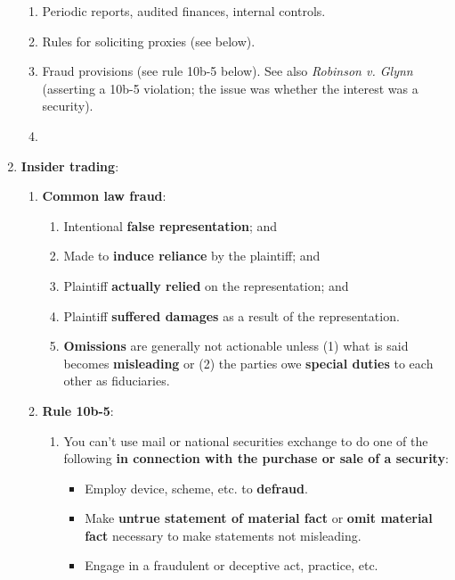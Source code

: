 \begin{enumerate}
\begin{enumerate}
        \item Periodic reports, audited finances, internal controls.
        \item Rules for soliciting proxies (see below).
        \item Fraud provisions (see rule 10b-5 below). See also \emph{Robinson 
        v. Glynn} (asserting a 10b-5 violation; the issue was whether 
        the interest was a security).
        \item 
    \end{enumerate}
    \item \textbf{Insider trading}:
    \begin{enumerate}
        \item \textbf{Common law fraud}:
        \begin{enumerate}
            \item Intentional \textbf{false representation}; and
            \item Made to \textbf{induce reliance} by the plaintiff; and
            \item Plaintiff \textbf{actually relied} on the representation; 
            and
            \item Plaintiff \textbf{suffered damages} as a result of the 
            representation.
            \item \textbf{Omissions} are generally not actionable unless (1) 
            what is said becomes \textbf{misleading} or (2) the parties owe 
            \textbf{special duties} to each other as fiduciaries.
        \end{enumerate}
        \item \textbf{Rule 10b-5}:
        \begin{enumerate}
            \item You can't use mail or national securities exchange to do one 
            of the following \textbf{in connection with the purchase or sale 
            of a security}:
            \begin{itemize}
                \item Employ device, scheme, etc. to \textbf{defraud}.
                \item Make \textbf{untrue statement of material fact} or 
                \textbf{omit material fact} necessary to make statements not 
                misleading.
                \item Engage in a fraudulent or deceptive act, practice, etc.
            \end{itemize}

\end{enumerate}
\end{enumerate}
\end{enumerate}

